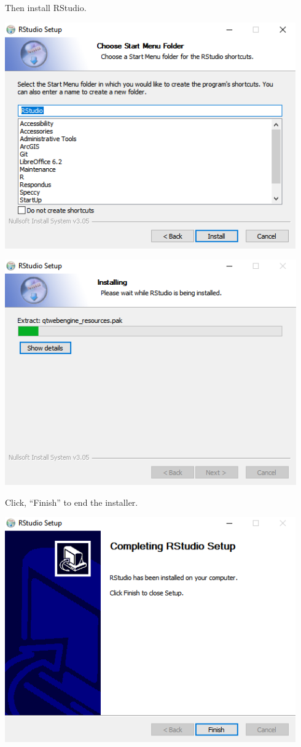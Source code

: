\documentclass[
]{book}
\begin{document}
Then install RStudio.

\includegraphics{images/05-rstudio_4.png}

\includegraphics{images/05-rstudio_5.png}

Click, ``Finish'' to end the installer.

\includegraphics{images/05-rstudio_6.png}
\end{document}
